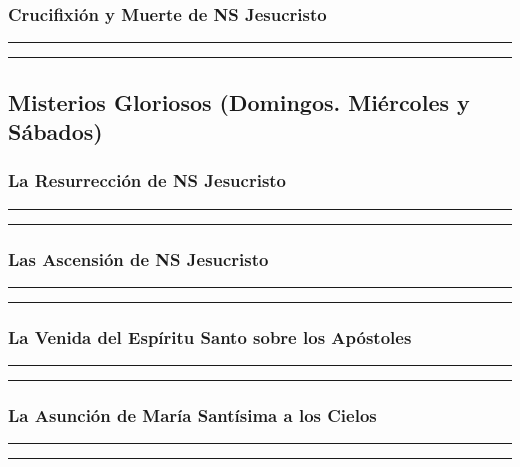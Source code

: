 \documentclass[11pt,a4paper]{report}
\begin{document}
    \subsubsection*{Crucifixión y Muerte de NS Jesucristo}
    
    
    \rule{\textwidth}{0.5pt}
    
    \rule{\textwidth}{0.5pt}
    

    \subsection*{Misterios Gloriosos (Domingos. Miércoles y Sábados)}

    \subsubsection*{La Resurrección de NS Jesucristo}
    
    
    \rule{\textwidth}{0.5pt}
    
    \rule{\textwidth}{0.5pt}
    

    \subsubsection*{Las Ascensión de NS Jesucristo}
    
    
    \rule{\textwidth}{0.5pt}
    
    \rule{\textwidth}{0.5pt}
    

    \subsubsection*{La Venida del Espíritu Santo sobre los Apóstoles}
    
    
    \rule{\textwidth}{0.5pt}
    
    \rule{\textwidth}{0.5pt}
    

    \subsubsection*{La Asunción de María Santísima a los Cielos}
    
    
    \rule{\textwidth}{0.5pt}
    
    \rule{\textwidth}{0.5pt}
    
\end{document}
